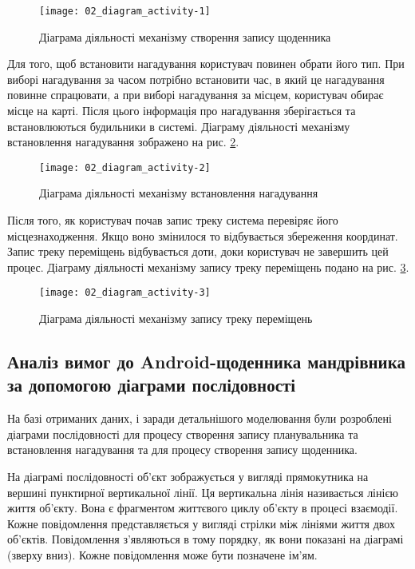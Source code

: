 \documentclass[../main.tex]{subfiles}
\begin{document}
\begin{figure}[H]
	\centering
	\texttt{[image: 02\_diagram\_activity-1]}
	\caption{Діаграма діяльності механізму створення запису щоденника}
	\label{diagram:activity_diary}
\end{figure}

Для того, щоб встановити нагадування користувач повинен обрати його тип. При виборі нагадування за часом потрібно встановити час, в який це нагадування повинне спрацювати, а при виборі нагадування за місцем, користувач обирає місце на карті. Після цього інформація про нагадування зберігається та встановлюються будильники в системі. Діаграму діяльності механізму встановлення нагадування зображено на рис. \ref{diagram:activity_reminder}.

\begin{figure}[H]
	\centering
	\texttt{[image: 02\_diagram\_activity-2]}
	\caption{Діаграма діяльності механізму встановлення нагадування}
	\label{diagram:activity_reminder}
\end{figure}

Після того, як користувач почав запис треку система перевіряє його місцезнаходження. Якщо воно змінилося то відбувається збереження координат. Запис треку переміщень відбувається доти, доки користувач не завершить цей процес. Діаграму діяльності механізму запису треку переміщень подано на рис. \ref{diagram:activity_tracking}.

\begin{figure}[H]
	\centering
	\texttt{[image: 02\_diagram\_activity-3]}
	\caption{Діаграма діяльності механізму запису треку переміщень}
	\label{diagram:activity_tracking}
\end{figure}

\subsection{Аналіз вимог до Android-щоденника мандрівника за допомогою діаграми послідовності}
На базі отриманих даних, і заради детальнішого моделювання були розроблені діаграми послідовності для процесу створення запису планувальника та встановлення нагадування та для процесу створення запису щоденника.

На діаграмі послідовності об’єкт зображується у вигляді прямокутника на вершині пунктирної вертикальної лінії. Ця вертикальна лінія називається лінією життя об’єкту. Вона є фрагментом життєвого циклу об’єкту в процесі взаємодії. Кожне повідомлення представляється у вигляді стрілки між лініями життя двох об’єктів. Повідомлення з’являються в тому порядку, як вони показані на діаграмі (зверху вниз). Кожне повідомлення може бути позначене ім’ям.
\end{document}
